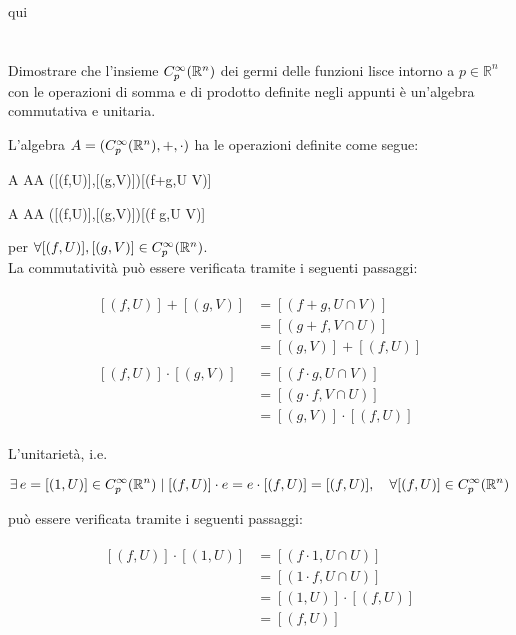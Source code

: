 qui

\tocless\section{}\label{es1-7}

\begin{tcolorbox}
	Dimostrare che l'insieme $ C_{p}^{\infty}(\mathbb{R}^{n}) $ dei germi delle funzioni lisce intorno a $ p \in \mathbb{R}^{n} $ con le operazioni di somma e di prodotto definite negli appunti è un'algebra commutativa e unitaria.
\end{tcolorbox}

L'algebra $ A = (C_{p}^{\infty}(\mathbb{R}^{n}),+,\cdot) $ ha le operazioni definite come segue:

\map{+}%
	{A \times A}{A}%
	{([(f,U)],[(g,V)])}{[(f+g,U \cap V)]}
	
\map{\cdot}%
	{A \times A}{A}%
	{([(f,U)],[(g,V)])}{[(f g,U \cap V)]}
	
per $ \forall [(f,U)],[(g,V)] \in C_{p}^{\infty}(\mathbb{R}^{n}) $.\\
La commutatività può essere verificata tramite i seguenti passaggi:

\begin{align}
	\begin{split}
		[(f,U)] + [(g,V)] &= [(f+g,U \cap V)]\\
		&= [(g+f,V \cap U)]\\
		&= [(g,V)] + [(f,U)]\\\\
		[(f,U)] \cdot [(g,V)] &= [(f \cdot g,U \cap V)]\\
		&= [(g \cdot f,V \cap U)]\\
		&= [(g,V)] \cdot [(f,U)]
	\end{split}
\end{align}

L'unitarietà, i.e.

\begin{equation}
	\exists \, e = [(1,U)] \in C_{p}^{\infty}(\R^{n}) \mid [(f,U)] \cdot e = e \cdot [(f,U)] = [(f,U)] \qcomma \forall [(f,U)] \in C_{p}^{\infty}(\R^{n})
\end{equation}

può essere verificata tramite i seguenti passaggi:

\begin{align}
	\begin{split}
		[(f,U)] \cdot [(1,U)] &= [(f \cdot 1,U \cap U)]\\
		&= [(1 \cdot f,U \cap U)]\\
		&= [(1,U)] \cdot [(f,U)]\\
		&= [(f,U)]
	\end{split}
\end{align}

